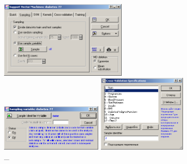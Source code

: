 \begin{figure}[!h]
  \centering

  \begin{minipage}{0.32\textwidth}
    \centering

    \includegraphics[height=3.8cm]
    {inc/v5_5.PNG}

    \caption{\_}

    \label{fig:v5_5}
  \end{minipage}
  \begin{minipage}{0.42\textwidth}
    \centering

    \includegraphics[width=5cm]
    {inc/v5_6.PNG}

    \caption{\_}

    \label{fig:v5_6}
  \end{minipage}
  \begin{minipage}{0.22\textwidth}
    \centering

    \includegraphics[height=3.8cm]
    {inc/v5_7.PNG}

    \caption{\_}

    \label{fig:v5_7}
  \end{minipage}
\end{figure}

